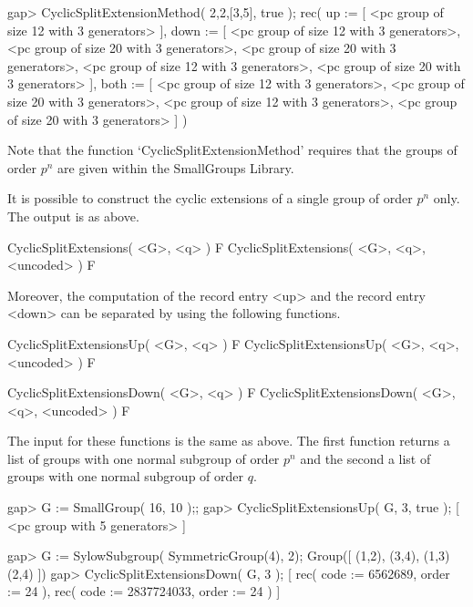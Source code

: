 gap> CyclicSplitExtensionMethod( 2,2,[3,5], true );
rec( up := [ <pc group of size 12 with 3 generators> ], 
  down  := [ <pc group of size 12 with 3 generators>, 
             <pc group of size 20 with 3 generators>, 
             <pc group of size 20 with 3 generators>, 
             <pc group of size 12 with 3 generators>, 
             <pc group of size 20 with 3 generators> ], 
  both  := [ <pc group of size 12 with 3 generators>, 
             <pc group of size 20 with 3 generators>, 
             <pc group of size 12 with 3 generators>, 
             <pc group of size 20 with 3 generators> ] )
\endexample

Note that the function `CyclicSplitExtensionMethod' requires that
the groups of order $p^n$ are given within the SmallGroups Library. 


It is possible to construct the cyclic extensions of a single group
of order $p^n$ only. The output is as above.

\>CyclicSplitExtensions( <G>, <q> ) F
\>CyclicSplitExtensions( <G>, <q>, <uncoded> ) F

Moreover, the computation of the record entry <up> and the record
entry <down> can be separated by using the following functions.

\> CyclicSplitExtensionsUp( <G>, <q> ) F
\> CyclicSplitExtensionsUp( <G>, <q>, <uncoded> ) F

\> CyclicSplitExtensionsDown( <G>, <q> ) F
\> CyclicSplitExtensionsDown( <G>, <q>, <uncoded> ) F

The input for these functions is the same as above. The first
function returns a list of groups with one normal subgroup of order
$p^n$ and the second a list of groups with one normal subgroup of order
$q$. 

\beginexample
gap> G := SmallGroup( 16, 10 );;
gap> CyclicSplitExtensionsUp( G, 3, true );
[ <pc group with 5 generators> ]

gap> G := SylowSubgroup( SymmetricGroup(4), 2);
Group([ (1,2), (3,4), (1,3)(2,4) ])
gap> CyclicSplitExtensionsDown( G, 3 );
[ rec( code := 6562689, order := 24 ), 
  rec( code := 2837724033, order := 24 ) ]
\endexample
